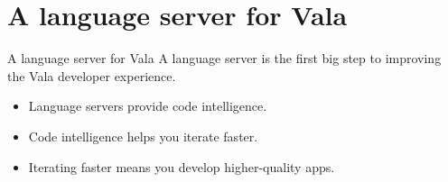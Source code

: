 \documentclass[t]{beamer}
\begin{document}


%    
%    
%    
%    
%    
%    

\section{A language server for Vala}
\begin{frame}[c]{A language server for Vala}
    A language server is the first big step to improving the Vala developer experience.
    
    \begin{itemize}
        \item Language servers provide code intelligence.
        \item Code intelligence helps you iterate faster.
        \item Iterating faster means you develop higher-quality apps.
    \end{itemize}
\end{frame}
\end{document}
